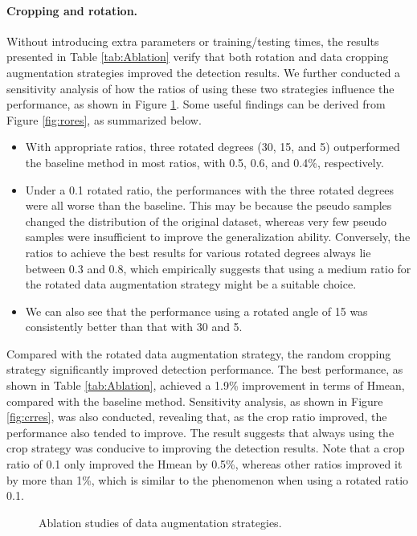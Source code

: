 \paragraph{Cropping and rotation.} Without introducing extra parameters or training/testing times, the results presented in Table \ref{tab:Ablation} verify that both rotation and data cropping augmentation strategies improved the detection results. We further conducted a sensitivity analysis of how the ratios of using these two strategies influence the performance, as shown in Figure \ref{fig:rc_results}. Some useful findings can be derived from Figure \ref{fig:rores}, as summarized below.
\begin{itemize}
  \item With appropriate ratios, three rotated degrees (30, 15, and 5) outperformed the baseline method in most ratios, with 0.5, 0.6, and 0.4\%, respectively. 
  \item Under a 0.1 rotated ratio, the performances with the three rotated degrees were all worse than the baseline. This may be because the pseudo samples changed the distribution of the original dataset, whereas very few pseudo samples were insufficient to improve the generalization ability. Conversely, the ratios to achieve the best results for various rotated degrees always lie between 0.3 and 0.8, which empirically suggests that using a medium ratio for the rotated data augmentation strategy might be a suitable choice.
  \item We can also see that the performance using a rotated angle of 15 was consistently better than that with 30 and 5.
\end{itemize}

Compared with the rotated data augmentation strategy, the random cropping strategy significantly improved detection performance. The best performance, as shown in Table \ref{tab:Ablation}, achieved a 1.9\% improvement in terms of Hmean, compared with the baseline method. Sensitivity analysis, as shown in Figure \ref{fig:crres}, was also conducted, revealing that, as the crop ratio improved, the performance also tended to improve. The result suggests that always using the crop strategy was conducive to improving the detection results. Note that a crop ratio of 0.1 only improved the Hmean by 0.5\%, whereas other ratios improved it by more than 1\%, which is similar to the phenomenon when using a rotated ratio 0.1.

\begin{figure}[t!]
	\centering
	\caption{Ablation studies of data augmentation strategies.}
	\label{fig:rc_results}
\end{figure}

